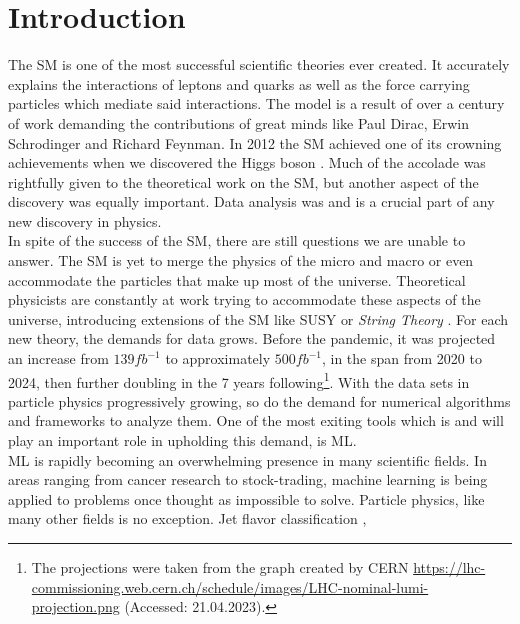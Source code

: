 \chapter*{Introduction}
The \ac{SM} is one of the most successful scientific theories ever
created. It accurately explains the interactions of leptons and quarks as well as the force
carrying particles which mediate said interactions. The model is a result of over a century of work
demanding the contributions of great minds like Paul Dirac, Erwin Schrodinger and Richard Feynman.
In 2012 the SM achieved one of its crowning achievements when we discovered the Higgs boson \cite{Aad_2012}. 
Much of the accolade was rightfully given to the theoretical work on the \ac{SM}, but another aspect of the discovery 
was equally important. Data analysis was and is a crucial part of any new discovery in physics. \newline
\\
In spite of the success of the \ac{SM}, there are still questions we are unable to answer.
The \ac{SM} is yet to merge the physics of the micro and macro or even accommodate the particles that make
up most of the universe. Theoretical physicists are constantly at work trying to accommodate these aspects of the universe,
introducing extensions of the \ac{SM} like \ac{SUSY} \cite{SUSY} or \emph{String Theory} \cite{cole_probing_2021}. For each new theory, 
the demands for data grows. Before the pandemic, it was projected an increase from $139fb^{-1}$ to approximately $500fb^{-1}$, in the span from 
2020 to 2024, then further doubling in the 7 years following\footnote{The projections were taken from the graph created by CERN
\href{https://lhc-commissioning.web.cern.ch/schedule/images/LHC-nominal-lumi-projection.png}{https://lhc-commissioning.web.cern.ch/schedule/images/LHC-nominal-lumi-projection.png}
(Accessed: 21.04.2023).}. With the data sets in particle physics progressively growing, so do the demand for numerical algorithms and frameworks to analyze them.
One of the most exiting tools which is and will play an important role in upholding this demand, is \ac{ML}.\newline
\\
\acf{ML} is rapidly becoming an overwhelming presence in many scientific fields.
In areas ranging from cancer research to stock-trading, machine learning is being applied to problems
once thought as impossible to solve. Particle physics, like many other fields is no exception. Jet flavor classification \cite{Guest_2016}, 
